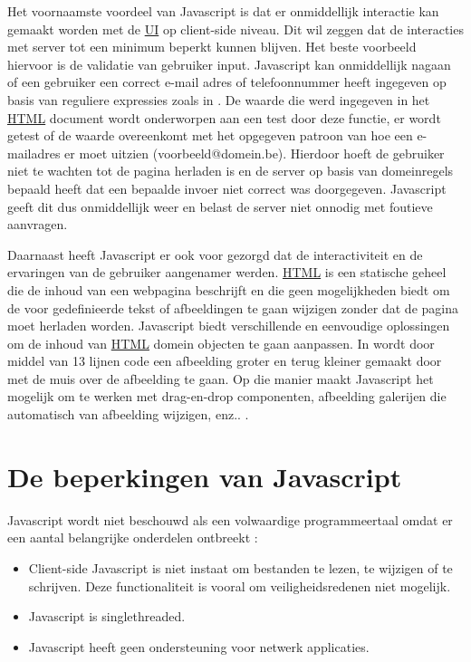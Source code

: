 	Het voornaamste voordeel van Javascript is dat er onmiddellijk interactie kan gemaakt worden met de \hyperref[ui]{UI} op client-side niveau. Dit wil zeggen dat de interacties met server tot een minimum beperkt kunnen blijven. Het beste voorbeeld hiervoor is de validatie van gebruiker input. Javascript kan onmiddellijk nagaan of een gebruiker een correct e-mail adres of telefoonnummer heeft ingegeven op basis van reguliere expressies zoals in . De waarde die werd ingegeven in het \hyperref[html]{HTML} document wordt onderworpen aan een test door deze functie, er wordt getest of de waarde overeenkomt met het opgegeven patroon van hoe een e-mailadres er moet uitzien (voorbeeld@domein.be). Hierdoor hoeft de gebruiker niet te wachten tot de pagina herladen is en de server op basis van domeinregels bepaald heeft dat een bepaalde invoer niet correct was doorgegeven. Javascript geeft dit dus onmiddellijk weer en belast de server niet onnodig met foutieve aanvragen.

	Daarnaast heeft Javascript er ook voor gezorgd dat de interactiviteit en de ervaringen van de gebruiker aangenamer werden. \hyperref[html]{HTML} is een statische geheel die de inhoud van een webpagina beschrijft en die geen mogelijkheden biedt om de voor gedefinieerde tekst of afbeeldingen te gaan wijzigen zonder dat de pagina moet herladen worden. Javascript biedt verschillende en eenvoudige oplossingen om de inhoud van \hyperref[html]{HTML} domein objecten te gaan aanpassen. \citep{vijaywebsolutions:Javascript}
	In  wordt door middel van 13 lijnen code een afbeelding groter en terug kleiner gemaakt door met de muis over de afbeelding te gaan. Op die manier maakt Javascript het mogelijk om te werken met drag-en-drop componenten, afbeelding galerijen die automatisch van afbeelding wijzigen, enz.. .

\section{De beperkingen van Javascript}
Javascript wordt niet beschouwd als een volwaardige programmeertaal omdat er een aantal belangrijke onderdelen ontbreekt : 
	\begin{itemize}
		\item Client-side Javascript is niet instaat om bestanden te lezen, te wijzigen of te schrijven. Deze functionaliteit is vooral om veiligheidsredenen niet mogelijk.
		\item Javascript is singlethreaded.
		\item Javascript heeft geen ondersteuning voor netwerk applicaties.
	\end{itemize} 
